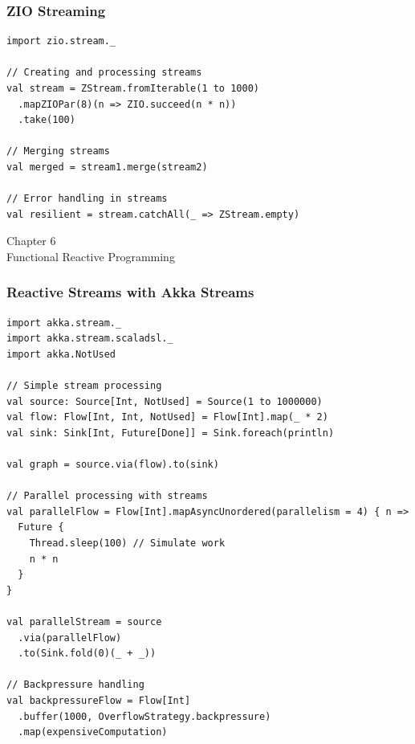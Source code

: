 \documentclass{beamer}
\newcommand{\chapterpage}[2]{
  \begin{frame}[plain]
    \centering
    \vfill
    {\usebeamerfont{title}\usebeamercolor[fg]{title}Chapter #1\\}
    \vspace{0.5cm}
    {\usebeamerfont{subtitle}#2}
    \vfill
  \end{frame}
}
\begin{document}
\begin{frame}[fragile]
\frametitle{ZIO Streaming}

\begin{lstlisting}[style=scalaStyle]
import zio.stream._

// Creating and processing streams
val stream = ZStream.fromIterable(1 to 1000)
  .mapZIOPar(8)(n => ZIO.succeed(n * n))
  .take(100)

// Merging streams
val merged = stream1.merge(stream2)

// Error handling in streams
val resilient = stream.catchAll(_ => ZStream.empty)
\end{lstlisting}

\end{frame}

\chapterpage{6}{Functional Reactive Programming}

\begin{frame}[fragile]
\frametitle{Reactive Streams with Akka Streams}

\begin{lstlisting}[style=scalaStyle]
import akka.stream._
import akka.stream.scaladsl._
import akka.NotUsed

// Simple stream processing
val source: Source[Int, NotUsed] = Source(1 to 1000000)
val flow: Flow[Int, Int, NotUsed] = Flow[Int].map(_ * 2)
val sink: Sink[Int, Future[Done]] = Sink.foreach(println)

val graph = source.via(flow).to(sink)

// Parallel processing with streams
val parallelFlow = Flow[Int].mapAsyncUnordered(parallelism = 4) { n =>
  Future {
    Thread.sleep(100) // Simulate work
    n * n
  }
}

val parallelStream = source
  .via(parallelFlow)
  .to(Sink.fold(0)(_ + _))

// Backpressure handling
val backpressureFlow = Flow[Int]
  .buffer(1000, OverflowStrategy.backpressure)
  .map(expensiveComputation)
\end{lstlisting}

\end{frame}
\end{document}
